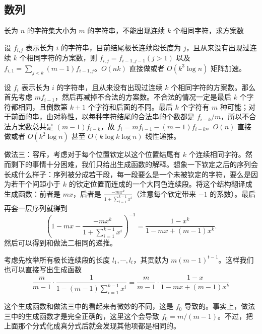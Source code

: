 \subsection{数列}
    \begin{example}
        长为 $n$ 的字符集大小为 $m$ 的字符串，不能出现连续 $k$ 个相同字符，求方案数
    \end{example}
    \begin{solution}[做法一]
        设 $f_{i,j}$ 表示长为 $i$ 的字符串，目前结尾极长连续段长度为 $j$，且从来没有出现过连续 $k$ 个相同字符的方案数，则 $f_{i,j}=f_{i-1,j-1}(j>1)$ 以及 $f_{i,1}=\sum_{j<k} (m-1)f_{i-1,j}$。$O(nk)$ 直接做或者 $O(k^3\log n)$ 矩阵加速。
    \end{solution}
    \begin{solution}[做法二]
        设 $f_i$ 表示长为 $i$ 的字符串，且从来没有出现过连续 $k$ 个相同字符的方案数。那么首先考虑 $mf_{i-1}$，然后再减掉不合法的方案数。不合法的情况一定是最后 $k$ 个字符都相同，且倒数第 $k+1$ 个字符和后面的不同。最后 $k$ 个字符有 $m$ 种可能；对于前面的串，由对称性，以每种字符结尾的合法串的个数都是 $f_{i-k}/m$，所以不合法方案数总共是 $(m-1)f_{i-k}$，故 $f_i=mf_{i-1}-(m-1)f_{i-k}$。$O(n)$ 直接做或者 $O(k^2\log n)$ 甚至 $O(k\log k\log n)$ 线性递推。
    \end{solution}
    \begin{solution}[做法三]
        做法三：容斥，考虑对于每个位置钦定以这个位置结尾有 $k$ 个连续相同字符。然而剩下的事情十分困难，我们只给出生成函数的解释。想象一下钦定之后的序列会长成什么样子：序列被分成若干段，每一段要么是一个未被钦定的字符，要么是因为若干个间距小于 $k$ 的钦定位置而连成的一个大同色连续段。将这个结构翻译成生成函数：前者是 $mx$，后者是 $\frac{-mx^k}{1+\sum_{i=1}^{k-1}x^i}$（注意每个钦定带来 $-1$ 的系数）。最后再套一层序列就得到
        $$
        \left(1-mx-\frac{-mx^k}{1+\sum_{i=1}^{k-1}x^i}\right)^{-1}=\frac{1-x^k}{1-mx+(m-1)x^k}.
        $$
        然后可以得到和做法二相同的递推。
    \end{solution}
    \begin{solution}[做法四]
        考虑先枚举所有极长连续段的长度 $l_1,\cdots,l_t$，其贡献为 $m(m-1)^{t-1}$。这样我们也可以直接写出生成函数 
        $$
        \frac{m}{m-1}\cdot \frac{1}{1-(m-1)\sum_{i=1}^{k-1}x^i}=\frac{m}{m-1}\cdot \frac{1-x}{1-mx+(m-1)x^k}
        $$

        这个生成函数和做法三中的看起来有微妙的不同，这是 $f_0$ 导致的。事实上，做法三中的生成函数才是完全正确的，这里这个会导致 $f_0=m/(m-1)$。不过，把上面那个分式化成真分式后就会发现其他项都是相同的。
    \end{solution}
